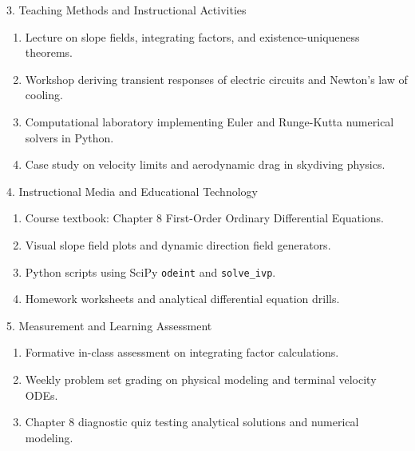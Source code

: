 \newpage

\begin{planbox}[colframe=rbruNavy!85!black, colbacktitle=rbruNavy!85!black]{3. Teaching Methods and Instructional Activities}
\begin{enumerate}[topsep=2pt, itemsep=1pt, partopsep=0pt, parsep=0pt, leftmargin=1.5em]
    \item Lecture on slope fields, integrating factors, and existence-uniqueness theorems.
    \item Workshop deriving transient responses of electric circuits and Newton's law of cooling.
    \item Computational laboratory implementing Euler and Runge-Kutta numerical solvers in Python.
    \item Case study on velocity limits and aerodynamic drag in skydiving physics.
\end{enumerate}
\end{planbox}

\begin{planbox}[colframe=rbruGold!90!black, colbacktitle=rbruGold!90!black]{4. Instructional Media and Educational Technology}
\begin{enumerate}[topsep=2pt, itemsep=1pt, partopsep=0pt, parsep=0pt, leftmargin=1.5em]
    \item Course textbook: Chapter 8 First-Order Ordinary Differential Equations.
    \item Visual slope field plots and dynamic direction field generators.
    \item Python scripts using SciPy \texttt{odeint} and \texttt{solve\_ivp}.
    \item Homework worksheets and analytical differential equation drills.
\end{enumerate}
\end{planbox}

\begin{planbox}[colframe=rbruSlate, colbacktitle=rbruSlate]{5. Measurement and Learning Assessment}
\begin{enumerate}[topsep=2pt, itemsep=1pt, partopsep=0pt, parsep=0pt, leftmargin=1.5em]
    \item Formative in-class assessment on integrating factor calculations.
    \item Weekly problem set grading on physical modeling and terminal velocity ODEs.
    \item Chapter 8 diagnostic quiz testing analytical solutions and numerical modeling.
\end{enumerate}
\end{planbox}
\clearpage

